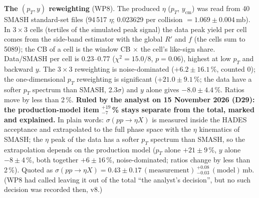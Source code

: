 \documentclass[11pt,a4paper]{article}
\newcommand{\sigeta}{\ensuremath{\sigma(pp\to\eta X)}\xspace}
\begin{document}
\textbf{The $(p_T,y)$ reweighting} (WP8). The produced $\eta$ ($p_T$, $y_{\mathrm{cm}}$) was read from 40 SMASH standard-set files (94\,517 $\eta$;
0.023629 per collision $=1.069\pm0.004$\,mb). In $3\times3$ cells (tertiles of the simulated peak signal) the data peak yield per cell comes from
the side-band estimator with the global $R'$ and $f$ (the cells sum to 5089); the CB of a cell is the window CB $\times$ the cell's like-sign
share. Data/SMASH per cell is 0.23--0.77 ($\chi^2=15.0/8$, $p=0.06$), highest at low $p_T$ and backward $y$. The $3\times3$ reweighting is
noise-dominated ($+6.2\pm16.1$\,\%, counted 0); the one-dimensional $p_T$ reweighting is significant ($+21.0\pm9.1$\,\%; the data have a softer
$p_T$ spectrum than SMASH, 2.3$\sigma$) and $y$ alone gives $-8.0\pm4.4$\,\%. Ratios move by less than 2\,\%. \textbf{Ruled by the analyst on 15 November 2026 (D29): the
production-model item $^{+19}_{-7}$\,\% stays separate from the total, marked and explained.} In plain words: \sigeta is measured inside the HADES
acceptance and extrapolated to the full phase space with the $\eta$ kinematics of SMASH; the $\eta$ peak of the data has a softer $p_T$ spectrum than
SMASH, so the extrapolation depends on the production model ($p_T$ alone $+21\pm9$\,\%, $y$ alone $-8\pm4$\,\%, both together $+6\pm16$\,\%,
noise-dominated; ratios change by less than 2\,\%). Quoted as $\sigeta=0.43\pm0.17\,(\mathrm{measurement})\,^{+0.08}_{-0.03}\,(\mathrm{model})$\,mb.
(WP8 had called leaving it out of the total ``the analyst's decision'', but no such decision was recorded then, v8.)
\end{document}
